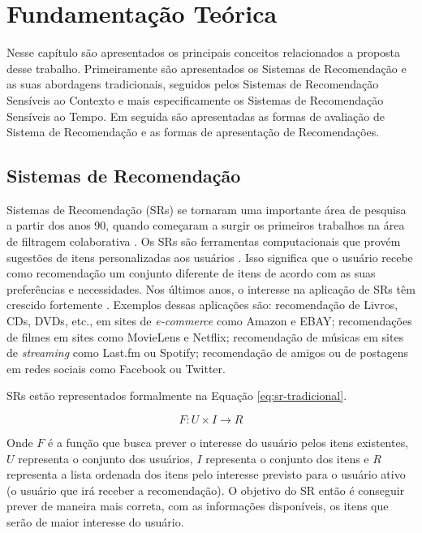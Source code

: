 \chapter{Fundamentação Teórica}\label{chapter:fundamentacao-teorica}

Nesse capítulo são apresentados os principais conceitos relacionados a proposta desse trabalho. Primeiramente são apresentados
os Sistemas de Recomendação e as suas abordagens tradicionais, seguidos pelos Sistemas de Recomendação Sensíveis ao Contexto
e mais especificamente os Sistemas de Recomendação Sensíveis ao Tempo. Em seguida são apresentadas as formas de avaliação de Sistema de Recomendação
e as formas de apresentação de Recomendações.

\section{Sistemas de Recomendação}

Sistemas de Recomendação (SRs) se tornaram uma importante área de pesquisa a partir dos anos 90, quando começaram a
surgir os primeiros trabalhos na área de filtragem colaborativa \cite{adomavicius2005toward}. Os SRs são ferramentas
computacionais que provém sugestões de itens personalizadas aos usuários \cite{ricci2011introduction}. Isso significa
que o usuário recebe como recomendação um conjunto diferente de itens de acordo com as suas preferências e necessidades.
Nos últimos anos, o interesse na aplicação de SRs têm crescido fortemente \cite{adomavicius2005toward, beel2016towards}.
Exemplos dessas aplicações são: recomendação de Livros, CDs, DVDs, etc., em sites de \textit{e-commerce} como Amazon e EBAY;
recomendações de filmes em sites como MovieLens e Netflix; recomendação de músicas em sites de \textit{streaming} como Last.fm ou
Spotify; recomendação de amigos ou de postagens em redes sociais como Facebook ou Twitter.

SRs estão representados formalmente na Equação \ref{eq:sr-tradicional}.

\begin{equation}
  F: U \times I \rightarrow R
  \label{eq:sr-tradicional}
\end{equation}

Onde $F$ é a função que busca prever o interesse do usuário pelos itens existentes, $U$ representa o conjunto dos usuários,
$I$ representa o conjunto dos itens e $R$ representa a lista ordenada dos itens pelo interesse previsto para o usuário ativo
(o usuário que irá receber a recomendação). O objetivo do SR então é conseguir prever de maneira mais correta, com as
informações disponíveis, os itens que serão de maior interesse do usuário.

